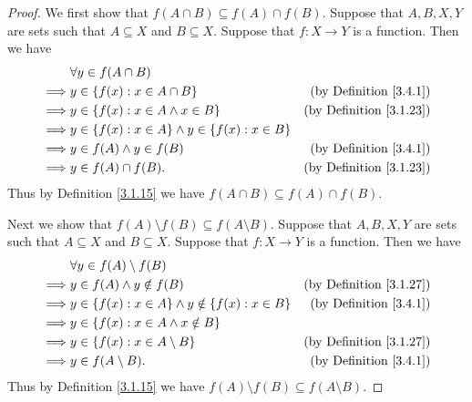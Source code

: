 \begin{proof}
    We first show that \(f(A \cap B) \subseteq f(A) \cap f(B)\).
    Suppose that \(A, B, X, Y\) are sets such that \(A \subseteq X\) and \(B \subseteq X\).
    Suppose that \(f : X \to Y\) is a function.
    Then we have
    \begin{align*}
                 & \forall y \in f(A \cap B)                                                                     \\
        \implies & y \in \{f(x) : x \in A \cap B\}                         & \text{(by Definition \ref{3.4.1})}  \\
        \implies & y \in \{f(x) : x \in A \land x \in B\}                  & \text{(by Definition \ref{3.1.23})} \\
        \implies & y \in \{f(x) : x \in A\} \land y \in \{f(x) : x \in B\}                                       \\
        \implies & y \in f(A) \land y \in f(B)                             & \text{(by Definition \ref{3.4.1})}  \\
        \implies & y \in f(A) \cap f(B).                                   & \text{(by Definition \ref{3.1.23})}
    \end{align*}
    Thus by Definition \ref{3.1.15} we have \(f(A \cap B) \subseteq f(A) \cap f(B)\).

    Next we show that \(f(A) \setminus f(B) \subseteq f(A \setminus B)\).
    Suppose that \(A, B, X, Y\) are sets such that \(A \subseteq X\) and \(B \subseteq X\).
    Suppose that \(f : X \to Y\) is a function.
    Then we have
    \begin{align*}
                 & \forall y \in f(A) \setminus f(B)                                                                \\
        \implies & y \in f(A) \land y \notin f(B)                             & \text{(by Definition \ref{3.1.27})} \\
        \implies & y \in \{f(x) : x \in A\} \land y \notin \{f(x) : x \in B\} & \text{(by Definition \ref{3.4.1})}  \\
        \implies & y \in \{f(x) : x \in A \land x \notin B\}                                                        \\
        \implies & y \in \{f(x) : x \in A \setminus B\}                       & \text{(by Definition \ref{3.1.27})} \\
        \implies & y \in f(A \setminus B).                                    & \text{(by Definition \ref{3.4.1})}
    \end{align*}
    Thus by Definition \ref{3.1.15} we have \(f(A) \setminus f(B) \subseteq f(A \setminus B)\).


\end{proof}
